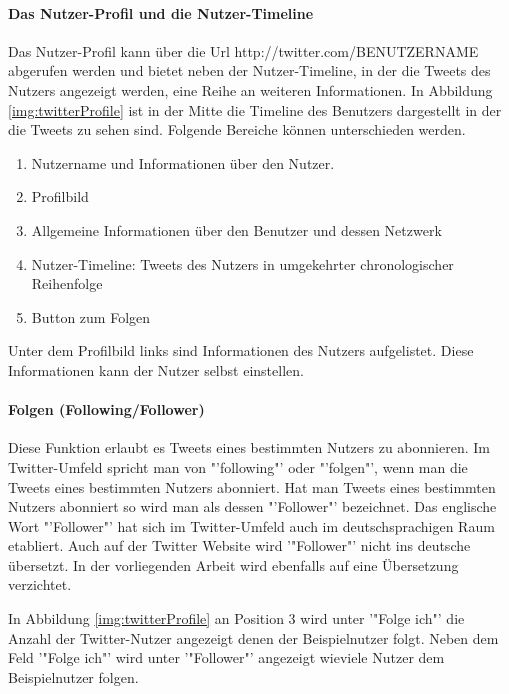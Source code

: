 			\paragraph{Das Nutzer-Profil und die Nutzer-Timeline}
				Das Nutzer-Profil kann über die Url http://twitter.com/BENUTZERNAME abgerufen werden und bietet neben der Nutzer-Timeline, in der die Tweets des Nutzers angezeigt werden, eine Reihe an weiteren Informationen.
				In Abbildung \ref{img:twitterProfile} ist in der Mitte die Timeline des Benutzers dargestellt in der die Tweets zu sehen sind. 
				Folgende Bereiche können unterschieden werden.
				\begin{enumerate}
					\item Nutzername und Informationen über den Nutzer. 
					\item Profilbild
					\item Allgemeine Informationen über den Benutzer und dessen Netzwerk
					\item Nutzer-Timeline: Tweets des Nutzers in umgekehrter chronologischer Reihenfolge 
					\item Button zum Folgen
				\end{enumerate}
				
				Unter dem Profilbild links sind Informationen des Nutzers aufgelistet.
				Diese Informationen kann der Nutzer selbst einstellen.   


			\paragraph{Folgen (Following/Follower)}
				
				Diese Funktion erlaubt es Tweets eines bestimmten Nutzers zu abonnieren. 
				Im Twitter-Umfeld spricht man von "'following"' oder "'folgen"', wenn man die Tweets eines bestimmten Nutzers abonniert.
				Hat man Tweets eines bestimmten Nutzers abonniert so wird man als dessen "'Follower"' bezeichnet. 
				Das englische Wort "'Follower"' hat sich im Twitter-Umfeld auch im deutschsprachigen Raum etabliert. 
				Auch auf der Twitter Website wird '"Follower"' nicht ins deutsche übersetzt.
				In der vorliegenden Arbeit wird ebenfalls auf eine Übersetzung verzichtet. 

				In Abbildung \ref{img:twitterProfile} an Position 3 wird unter '"Folge ich"' die Anzahl der Twitter-Nutzer angezeigt denen der Beispielnutzer folgt. 
				Neben dem Feld '"Folge ich"' wird unter '"Follower"' angezeigt wieviele Nutzer dem Beispielnutzer folgen.

